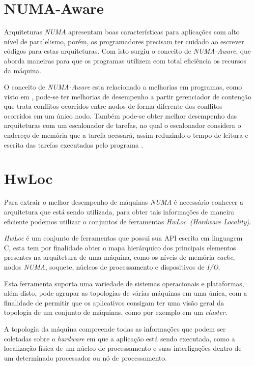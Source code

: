 \documentclass[diss,capa]{texufpel}
\begin{document}
\section{NUMA-Aware}

Arquiteturas \emph{NUMA} apresentam boas características para aplicações com alto nível de paralelismo, porém, os programadores precisam ter cuidado ao escrever códigos para estas arquiteturas. Com isto surgiu o conceito de \emph{NUMA-Aware}, que aborda maneiras para que os programas utilizem com total eficiência os recursos da máquina.

O conceito de \emph{NUMA-Aware} esta relacionado a melhorias em programas, como visto em \cite{mohamedin2016}, pode-se ter melhorias de desempenho a partir gerenciador de contenção que trata conflitos ocorridos entre nodos de forma diferente dos conflitos ocorridos em um único nodo. Também pode-se obter melhor desempenho das arquiteturas com um escalonador de tarefas, no qual o escalonador considera o endereço de memória que a tarefa acessará, assim reduzindo o tempo de leitura e escrita das tarefas executadas pelo programa \cite{blagodurov2010}.


\section{HwLoc}

Para extrair o melhor desempenho de máquinas \emph{NUMA} é necessário conhecer a arquitetura que está sendo utilizada, para obter tais informações de maneira eficiente podemos utilizar o conjuntos de ferramentas \emph{HwLoc~(Hardware Locality)}.

\emph{HwLoc} é um conjunto de ferramentas que possui sua API escrita em linguagem C, esta tem por finalidade obter o mapa hierárquico dos principais elementos presentes na arquitetura de uma máquina, como os níveis de memória \emph{cache}, nodos \emph{NUMA}, soquete, núcleos de processamento e dispositivos de \emph{I/O}.

Esta ferramenta suporta uma variedade de sistemas operacionais e plataformas, além disto, pode agrupar as topologias de várias máquinas em uma única, com a finalidade de permitir que os aplicativos consigam ter uma visão geral da topologia de um conjunto de máquinas, como por exemplo em um \emph{cluster}.

A topologia da máquina compreende todas as informações que podem ser coletadas sobre o \emph{hardware} em que a aplicação está sendo executada, como a localização física de um núcleo de processamento e suas interligações dentro de um determinado processador ou nó de processamento.
\end{document}
